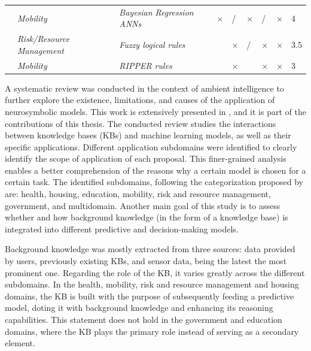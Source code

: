 \begin{table}
{\begin{tabular}{M{3.5cm}M{2.2cm}M{4cm}M{.5cm}M{.5cm}M{.5cm}M{.5cm}M{.5cm}M{1.5cm}}
\cite{siimobility-parking,siimobility-consult,siimobility-journal}        & \textit{Mobility}                 & \textit{Bayesian Regression ANNs} \citep{brann1,brann2,brann3}                                     &$\times$                    & /                         &$\times$                               & /                                 &$\times$                        & 4                      \\
\cite{xuandli}           & \textit{Risk/Resource Management} & \textit{Fuzzy logical rules}                                         &                      &$\times$                         & /                               &$\times$                                 &$\times$                        & 3.5                    \\ 
\cite{zavalaetal}       & \textit{Mobility}                 & \textit{RIPPER rules} \citep{ripper}                                                &                      &$\times$                         &                                 &$\times$                                 &$\times$                        & 3                      \\ \bottomrule

\end{tabular}
}
\end{table}
A systematic review was conducted in the context of ambient intelligence to further explore the existence, limitations, and causes of the application of neurosymbolic models. This work is extensively presented in \cite{amador_systematic_review_2019}, and it is part of the contributions of this thesis. The conducted review studies the interactions between knowledge bases (KBs) and machine learning models, as well as their specific applications. Different application subdomains were identified to clearly identify the scope of application of each proposal. This finer-grained analysis enables a better comprehension of the reasons why a certain model is chosen for a certain task. The identified subdomains, following the categorization proposed by \cite{ahmedetal} are: health, housing, education, mobility, risk and resource management, government, and multidomain. Another main goal of this study is to assess whether and how background knowledge (in the form of a knowledge base) is integrated into different predictive and decision-making models.

Background knowledge was mostly extracted from three sources: data provided by users, previously existing KBs, and sensor data, being the latest the most prominent one. Regarding the role of the KB, it varies greatly across the different subdomains. In the health, mobility, risk and resource management and housing domains, the KB is built with the purpose of subsequently feeding a predictive model, doting it with background knowledge and enhancing its reasoning capabilities. This statement does not hold in the government and education domains, where the KB plays the primary role instead of serving as a secondary element.

